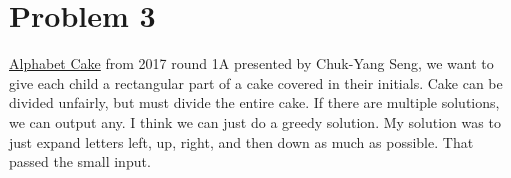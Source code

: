\documentclass[11pt]{article} %
\begin{document}
\section*{Problem 3}
\href{https://code.google.com/codejam/contest/5304486/dashboard}{Alphabet Cake} from 2017 round 1A presented by Chuk-Yang Seng, we want to give each child a rectangular part of a cake covered in their initials. Cake can be divided unfairly, but must divide the entire cake. If there are multiple solutions, we can output any. I think we can just do a greedy solution. My solution was to just expand letters left, up, right, and then down as much as possible. That passed the small input.
\end{document}
